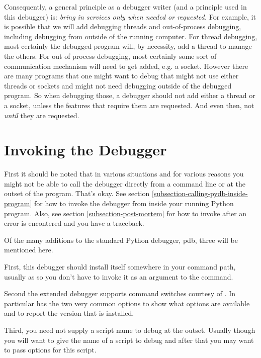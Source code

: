 Consequently, a general principle as a debugger writer (and a
principle used in this debugger) is: \emph{bring in services only when
needed or requested.}  For example, it is possible that we will add
debugging threads and out-of-process debugging, including debugging
from outside of the running computer. For thread debugging, most
certainly the debugged program will, by necessity, add a thread to
manage the others. For out of process debugging, most certainly some
sort of communication mechanism will need to get added, e.g. a
socket. However there are many programs that one might want to debug
that might not use either threads or sockets and might not need
debugging outside of the debugged program. So when debugging those, a
debugger should not add either a thread or a socket, unless the
features that require them are requested. And even then, not
\emph{until} they are requested.

\section{Invoking the Debugger \label{pydb-invocation}}

First it should be noted that in various situations and for various
reasons you might not be able to call the debugger directly from a
command line or at the outset of the program. That's okay. See section
\ref{subsection-calling-pydb-inside-program} for how to invoke the
debugger from inside your running Python program. Also, see section
\ref{subsection-post-mortem} for how to invoke after an error is
encontered and you have a traceback.

Of the many additions to the standard Python debugger, pdb, three will
be mentioned here. 

First, this debugger should install itself somewhere in your command
path, usually as  so you don't have to invoke it as an
argument to the  command.

Second the extended debugger supports command switches courtesy of
.
In particular  has the two very common options
 to show what options are available and 
to report the version that is installed. 

Third, you need not supply a script name to debug at the
outset. Usually though you will want to give the name of a script to
debug and after that you may want to pass options for this script.

